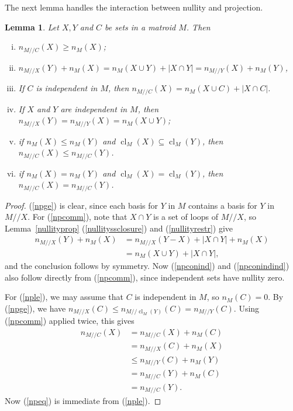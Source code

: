 \documentclass{amsart}
\theoremstyle{plain}
\newtheorem{lemma}[theorem]{Lemma}
\theoremstyle{definition}
\newcommand{\dcon}{/ \!\! /}
\DeclareMathOperator{\cl}{cl}
\renewcommand{\le}{\leqslant}
\renewcommand{\ge}{\geqslant}
\renewcommand{\ss}{\subseteq}
\begin{document}
The next lemma handles the interaction between nullity and projection.

\begin{lemma}\label{nullityproject}
  Let $X, Y$ and $C$ be sets in a matroid $M$. Then
  \begin{enumerate}[(i)]
    \item\label{npge} $n_{M \dcon C}(X) \ge n_M(X)$;
    \item\label{npcomm} 
      $n_{M \dcon X}(Y) + n_M(X) = n_M(X \cup Y) + |X \cap Y| = n_{M \dcon Y}(X) + n_M(Y)$, 
    \item\label{npconind}
      If $C$ is independent in $M$, then $n_{M \dcon C}(X) = n_M(X \cup C) + |X \cap C|$. 
    \item\label{npconindind}
      If $X$ and $Y$ are independent in $M$, 
      then $n_{M \dcon X}(Y) = n_{M \dcon Y}(X) = n_M(X \cup Y)$;
    \item\label{nple} if $n_M(X) \le n_M(Y)$ and $\cl_M(X) \ss \cl_M(Y)$, then $n_{M \dcon C}(X) \le n_{M \dcon C}(Y)$. 
    \item\label{npeq} if $n_M(X) = n_M(Y)$ and $\cl_M(X) = \cl_M(Y)$, then $n_{M \dcon C}(X) = n_{M \dcon C}(Y)$. 
  \end{enumerate}
\end{lemma}
\begin{proof}
  (\ref{npge}) is clear, since each basis for $Y$ in $M$ 
  contains a basis for $Y$ in $M \dcon X$. 
  For (\ref{npcomm}), note that $X \cap Y$ is a set of loops of $M \dcon X$, 
  so Lemma~\ref{nullityprop} (\ref{nullityssclosure}) and (\ref{nullityrestr}) give
  \begin{align*}
    n_{M \dcon X}(Y) + n_M(X) &= n_{M \dcon X}(Y-X) + |X \cap Y| + n_M(X)  \\
    &= n_M(X \cup Y) + |X \cap Y|,
  \end{align*}
  and the conclusion follows by symmetry. 
  Now (\ref{npconind}) and (\ref{npconindind}) also follow directly from (\ref{npcomm}), since independent sets have nullity zero. 

  For (\ref{nple}), we may assume that $C$ is independent in $M$, so $n_M(C) = 0$. 
  By (\ref{npge}), we have $n_{M \dcon X}(C) \le n_{M \dcon \cl_M(Y)}(C) = n_{M \dcon Y}(C)$. Using (\ref{npcomm}) applied twice, this gives 
  \begin{align*}
    n_{M \dcon C}(X) &= n_{M \dcon C}(X) + n_M(C) \\ 
    &= n_{M \dcon X}(C) + n_M(X) \\
    &\le n_{M \dcon Y}(C) + n_M(Y) \\
    &= n_{M \dcon C}(Y) + n_M(C) \\
    &= n_{M \dcon C}(Y).
  \end{align*}
  Now (\ref{npeq}) is immediate from (\ref{nple}).
\end{proof}
\end{document}
